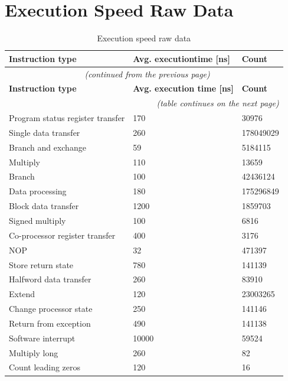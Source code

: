 \documentclass[english, ing, kiv, he, iso690numb, pdf]{fasthesis}
\begin{document}
	\null
	\vfill
	
	\newpage
	
	\section{Execution Speed Raw Data}
	
	\null
	\vfill
	
	\begin{center}
		\begin{longtable}{p{}p{}p{}}
			\caption{Execution speed raw data}
			\label{Execution speed raw data}\\
			\toprule[1.5pt]
			\textbf{Instruction type} & \textbf{Avg. execution\newline time [ns]} & \textbf{Count}\\
			\midrule
			\endfirsthead
			\multicolumn{3}{c}{\tablename{}~\thetable{} \textit{(continued from the previous page)}}\\
			\midrule
			\textbf{Instruction type} & \textbf{Avg. execution time [ns]} & \textbf{Count}\\
			\midrule
			\endhead
			\midrule
			\multicolumn{3}{r}{\textit{(table continues on the next page)}}\\
			\endfoot
			\bottomrule[1.5pt]
			\endlastfoot
			Program status register transfer & 170 & 30976 \\
			Single data transfer & 260 & 178049029 \\
			Branch and exchange & 59 & 5184115 \\
			Multiply & 110 & 13659 \\
			Branch & 100 & 42436124 \\
			Data processing & 180 & 175296849 \\
			Block data transfer & 1200 & 1859703 \\
			Signed multiply & 100 & 6816 \\
			Co-processor register transfer & 400 & 3176 \\
			NOP & 32 & 471397 \\
			Store return state & 780 & 141139 \\
			Halfword data transfer & 260 & 83910 \\
			Extend & 120 & 23003265 \\
			Change processor state & 250 & 141146 \\
			Return from exception & 490 & 141138 \\
			Software interrupt & 10000 & 59524 \\
			Multiply long & 260 & 82 \\
			Count leading zeros & 120 & 16 \\
		\end{longtable}
	\end{center}
	
\end{document}
